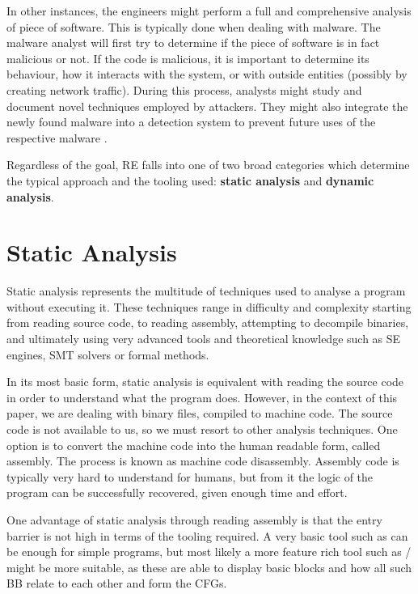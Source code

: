 In other instances, the engineers might perform a full and comprehensive analysis of piece of software. This is typically done when dealing with malware. The malware analyst will first try to determine if the piece of software is in fact malicious or not. If the code is malicious, it is important to determine its behaviour, how it interacts with the system, or with outside entities (possibly by creating network traffic). During this process, analysts might study and document novel techniques employed by attackers. They might also integrate the newly found malware into a detection system to prevent future uses of the respective malware \cite{malware_crowdstrike}.

Regardless of the goal, RE falls into one of two broad categories which determine the typical approach and the tooling used: \textbf{static analysis} and \textbf{dynamic analysis}.

\section{Static Analysis}

Static analysis represents the multitude of techniques used to analyse a program without executing it. These techniques range in difficulty and complexity starting from reading source code, to reading assembly, attempting to decompile binaries, and ultimately using very advanced tools and theoretical knowledge such as \gls{SE} engines, SMT solvers or formal methods. %

In its most basic form, static analysis is equivalent with reading the source code in order to understand what the program does. However, in the context of this paper, we are dealing with binary files, compiled to machine code. The source code is not available to us, so we must resort to other analysis techniques. One option is to convert the machine code into the human readable form, called assembly. The process is known as machine code disassembly. Assembly code is typically very hard to understand for humans, but from it the logic of the program can be successfully recovered, given enough time and effort. 

One advantage of static analysis through reading assembly is that the entry barrier is not high in terms of the tooling required. A very basic tool such as  \cite{TODO} can be enough for simple programs, but most likely a more feature rich tool such as / \cite{TODO} might be more suitable, as these are able to display basic blocks and how all such \gls{BB} relate to each other and form the \glspl{CFG}.


